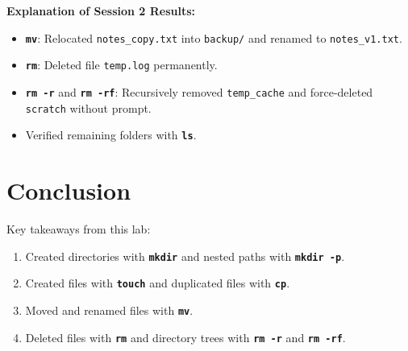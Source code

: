 \documentclass[10pt,a4paper]{article}
\newcommand{\cmd}[1]{\texttt{\textbf{#1}}}
\begin{document}
\vspace{2pt}\noindent\textbf{Explanation of Session 2 Results:}\par\vspace{1pt}
\begin{itemize}[noitemsep,topsep=1pt,leftmargin=1.2em]
  \item \cmd{mv}: Relocated \texttt{notes\_copy.txt} into \texttt{backup/} and renamed to \texttt{notes\_v1.txt}.
  \item \cmd{rm}: Deleted file \texttt{temp.log} permanently.
  \item \cmd{rm -r} and \cmd{rm -rf}: Recursively removed \texttt{temp\_cache} and force-deleted \texttt{scratch} without prompt.
  \item Verified remaining folders with \cmd{ls}.
\end{itemize}

\section{Conclusion}
Key takeaways from this lab:
\begin{enumerate}[noitemsep,topsep=1pt,leftmargin=1.4em]
  \item Created directories with \cmd{mkdir} and nested paths with \cmd{mkdir -p}.
  \item Created files with \cmd{touch} and duplicated files with \cmd{cp}.
  \item Moved and renamed files with \cmd{mv}.
  \item Deleted files with \cmd{rm} and directory trees with \cmd{rm -r} and \cmd{rm -rf}.
\end{enumerate}
\end{document}
